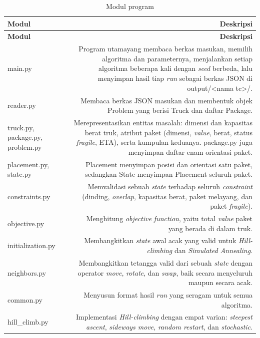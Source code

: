 \renewcommand{\arraystretch}{1.2}
\begin{longtable}{|K|D|}
\caption{Modul program} \\
\hline
\textbf{Modul} & \textbf{Deskripsi} \\
\hline
\endfirsthead

\hline
\textbf{Modul} & \textbf{Deskripsi} \\
\hline
\endhead

\hline
\endfoot

\hline
\endlastfoot

main.py & Program utamayang membaca berkas masukan, memilih algoritma dan parameternya, menjalankan setiap algoritma beberapa kali dengan \textit{seed} berbeda, lalu menyimpan hasil tiap \textit{run} sebagai berkas JSON di output/<nama tc>/. \\ \hline
reader.py & Membaca berkas JSON masukan dan membentuk objek Problem yang berisi Truck dan daftar Package. \\ \hline
truck.py, package.py, problem.py & Merepresentasikan entitas masalah: dimensi dan kapasitas berat truk, atribut paket (dimensi, \textit{value}, berat, status \textit{fragile}, ETA), serta kumpulan keduanya. package.py juga menyimpan daftar enam orientasi paket. \\ \hline
placement.py, state.py & Placement menyimpan posisi dan orientasi satu paket, sedangkan State menyimpan Placement seluruh paket. \\ \hline
constraints.py & Memvalidasi sebuah \textit{state} terhadap seluruh \textit{constraint} (dinding, \textit{overlap}, kapasitas berat, paket melayang, dan paket \textit{fragile}). \\ \hline
objective.py & Menghitung \textit{objective function}, yaitu total \textit{value} paket yang berada di dalam truk. \\ \hline
initialization.py & Membangkitkan \textit{state} awal acak yang valid untuk \textit{Hill-climbing} dan \textit{Simulated Annealing}. \\ \hline
neighbors.py & Membangkitkan tetangga valid dari sebuah \textit{state} dengan operator \textit{move}, \textit{rotate}, dan \textit{swap}, baik secara menyeluruh maupun secara acak. \\ \hline
common.py & Menyusun format hasil \textit{run} yang seragam untuk semua algoritma. \\ \hline
hill\_climb.py & Implementasi \textit{Hill-climbing} dengan empat varian: \textit{steepest ascent}, \textit{sideways move}, \textit{random restart}, dan \textit{stochastic}. \\ \hline

\end{longtable}
